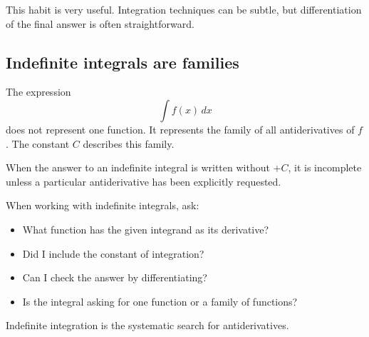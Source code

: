 This habit is very useful. Integration techniques can be subtle, but differentiation of the final answer is often straightforward.

\subsection*{Indefinite integrals are families}

The expression
\[
\int f(x)\,dx
\]
does not represent one function. It represents the family of all antiderivatives of \(f\). The constant \(C\) describes this family.

\begin{remarkbox}
When the answer to an indefinite integral is written without \(+C\), it is incomplete unless a particular antiderivative has been explicitly requested.
\end{remarkbox}

\begin{summarybox}
When working with indefinite integrals, ask:
\begin{itemize}
\item What function has the given integrand as its derivative?
\item Did I include the constant of integration?
\item Can I check the answer by differentiating?
\item Is the integral asking for one function or a family of functions?
\end{itemize}
\end{summarybox}

Indefinite integration is the systematic search for antiderivatives.